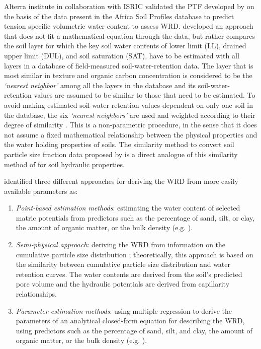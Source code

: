 \documentclass[graybox,natbib,nospthms,UStrade]{svmono}
\begin{document}
Alterra institute in collaboration with ISRIC validated the PTF
developed by \citet{hodnett2002marked} on the basis of the data present in
the Africa Soil Profiles database \citep{Leenaars2012} to predict tension
specific volumetric water content \citep{wosten2013soil} to assess WRD.
\citet{Jagtap2004TASAE} developed an approach that does not fit a mathematical
equation through the data, but rather compares the soil layer for which
the key soil water contents of lower limit (LL), drained upper limit
(DUL), and soil saturation (SAT), have to be estimated with all layers
in a database of field-measured soil-water-retention data. The layer
that is most similar in texture and organic carbon concentration is
considered to be the \emph{`nearest neighbor'} among all the layers in the
database and its soil-water-retention values are assumed to be similar
to those that need to be estimated. To avoid making estimated
soil-water-retention values dependent on only one soil in the database,
the six \emph{`nearest neighbors'} are used and weighted according to their
degree of similarity \citep{Jagtap2004TASAE}. This is a non-parametric
procedure, in the sense that it does not assume a fixed mathematical
relationship between the physical properties and the water holding
properties of soils. The similarity method to convert soil particle size
fraction data proposed by \citeauthor{Nemes1999G} \citetext{\citeyear{Nemes1999G}; \citealp{Nemes1999}} is a direct analogue
of this similarity method of \citet{Jagtap2004TASAE} for soil hydraulic
properties.

\citet{Zacharias2007SSSAJ} identified three different approaches for deriving
the WRD from more easily available parameters as:

\begin{enumerate}
\def\labelenumi{\arabic{enumi}.}
\item
  \emph{Point-based estimation methods}: estimating the water content of
  selected matric potentials from predictors such as the percentage of
  sand, silt, or clay, the amount of organic matter, or the bulk
  density (e.g. \citet{Rawls1982JIDDASCE}).
\item
  \emph{Semi-physical approach}: deriving the WRD from information on the
  cumulative particle size distribution \citep{Arya1981SSSAJ};
  theoretically, this approach is based on the similarity between
  cumulative particle size distribution and water retention curves.
  The water contents are derived from the soil's predicted pore volume
  and the hydraulic potentials are derived from
  capillarity relationships.
\item
  \emph{Parameter estimation methods}: using multiple regression to derive
  the parameters of an analytical closed-form equation for describing
  the WRD, using predictors such as the percentage of sand, silt, and
  clay, the amount of organic matter, or the bulk density (e.g.
  \citeauthor{van1980closed} \citetext{\citeyear{van1980closed}; \citealp{Wosten1999G}; \citealp{wosten2013soil}}).
\end{enumerate}
\end{document}
